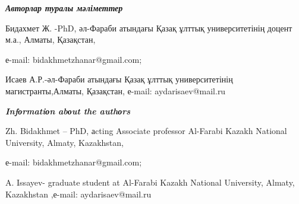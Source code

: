 \emph{{\bfseries Авторлар туралы мәліметтер}}

\begin{noparindent}
Бидахмет Ж. -PhD, әл-Фараби атындағы Қазақ ұлттық университетінің доцент
м.а., Алматы, Қазақстан,

е-mail: bidakhmetzhanar@gmail.com;

Исаев А.Р.-әл-Фараби атындағы Қазақ ұлттық университетінің
магистранты,Алматы, Қазақстан, е-mail: aydarisaev@mail.ru
\end{noparindent}

\emph{{\bfseries Infоrmatiоn abоut the authоrs}}

\begin{noparindent}
Zh. Bidakhmet -- PhD, аcting Associate professor Al-Farabi Kazakh
National University, Almaty, Kazakhstan,

е-mail: bidakhmetzhanar@gmail.com;

A. Issayev- graduate student at Al-Farabi Kazakh National University,
Almaty, Kazakhstan ,е-mail: aydarisaev@mail.ru
\end{noparindent}
